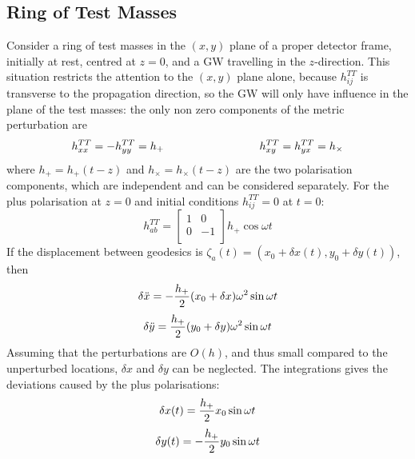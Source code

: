 \documentclass[binding=0.6cm, LaM]{sapthesis}
\begin{document}
\subsection{Ring of Test Masses}
        Consider a ring of test masses in the $(x, y)$ plane of a proper detector frame, initially at rest, centred at $z = 0$,
        and a GW travelling in the $z$-direction.
        This situation restricts the attention to the $(x,y)$ plane alone, because $h_{ij}^{TT}$ is transverse to the propagation direction,
        so the GW will only have influence in the plane of the test masses:
        the only non zero components of the metric perturbation are
        \begin{equation}
          h_{xx}^{TT} = - h_{yy}^{TT} = h_{+} \hspace*{3cm} h_{xy}^{TT} = h_{yx}^{TT} = h_{\times}
        \end{equation}
        where $h_{+}=h_{+}(t-z)$ and $h_{\times}=h_{\times}(t-z)$ are the two polarisation components, which are independent and can be considered separately.
        For the plus polarisation at $z=0$ and initial conditions $h_{ij}^{TT} = 0$ at $t=0$:
        \begin{equation}
          h_{ab}^{TT} = 
          \begin{bmatrix}
            1  & 0 \\
            0 &  -1 \\
          \end{bmatrix} 
          h_{+}\cos \omega t
        \end{equation}
        If the displacement between geodesics is $\zeta_a (t) = (x_0 + \delta x(t), y_0 + \delta y(t))$, then
        \begin{equation}
          \delta {\ddot x} = - {{h_{+}} \over 2} (x_0 + \delta x) \omega ^2 \sin \omega t
        \end{equation}
        \begin{equation}
          \delta {\ddot y} =  {{h_{+}} \over 2} (y_0 + \delta y) \omega ^2 \sin \omega t
        \end{equation}
        Assuming that the perturbations are $O(h)$, and thus small compared to the unperturbed locations, $\delta x$ and $\delta y$ can be neglected.
        The integrations gives the deviations caused by the plus polarisations:
        \begin{equation}
          \delta x(t) =  {{h_{+}} \over 2} x_0 \sin \omega t
        \end{equation}
        \begin{equation}
          \delta y(t) = - {{h_{+}} \over 2} y_0  \sin \omega t
        \end{equation}
\end{document}
